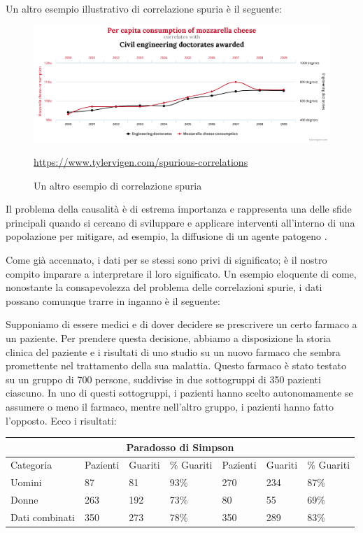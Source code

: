 Un altro esempio illustrativo di correlazione spuria è il seguente:

\begin{figure}[h]
    \begin{center}
        \includegraphics[width=\linewidth]{img/chart1.png}
        \caption{Un altro esempio di correlazione spuria}
        \url{https://www.tylervigen.com/spurious-correlations}
        \label{fig:another_spurious_relations}
    \end{center}
\end{figure}

Il problema della causalità è di estrema importanza e rappresenta 
una delle sfide principali quando si cercano di sviluppare e 
applicare interventi all'interno di una popolazione per mitigare, 
ad esempio, la diffusione di un agente patogeno \cite{Parascandola2001-kw}.

Come già accennato, i dati per se stessi sono privi di significato; 
è il nostro compito imparare a interpretare il loro significato. 
Un esempio eloquente di come, nonostante la consapevolezza del problema 
delle correlazioni spurie, i dati possano comunque trarre in inganno 
è il seguente:

Supponiamo di essere medici e di dover decidere se prescrivere un 
certo farmaco a un paziente. Per prendere questa decisione, abbiamo 
a disposizione la storia clinica del paziente e i risultati di uno 
studio su un nuovo farmaco che sembra promettente nel trattamento 
della sua malattia. Questo farmaco è stato testato su un gruppo di 
700 persone, suddivise in due sottogruppi di 350 pazienti ciascuno. 
In uno di questi sottogruppi, i pazienti hanno scelto autonomamente se 
assumere o meno il farmaco, mentre nell'altro gruppo, i pazienti hanno 
fatto l'opposto. Ecco i risultati:

\begin{tabular}{ |p{2.2cm}||p{1.6cm}|p{1.6cm}|p{1.6cm}||p{1.6cm}|p{1.6cm}|p{1.6cm}| }
    \hline
    \multicolumn{7}{|c|}{Paradosso di Simpson} \\
    \hline
    Categoria & Pazienti & Guariti & \% Guariti & Pazienti & Guariti & \% Guariti\\
    \hline
    Uomini & 87 & 81 & 93\% & 270 & 234 & 87\% \\
    Donne & 263 & 192 & 73\% & 80 & 55 & 69\% \\
    Dati combinati & 350 & 273 & 78\% & 350 & 289 & 83\% \\
    \hline
\end{tabular}

